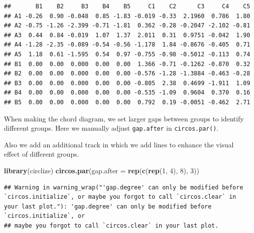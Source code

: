 \documentclass[]{book}
\newenvironment{Shaded}{\begin{snugshade}}{\end{snugshade}}
\newcommand{\KeywordTok}[1]{\textcolor[rgb]{0.13,0.29,0.53}{\textbf{#1}}}
\newcommand{\DataTypeTok}[1]{\textcolor[rgb]{0.13,0.29,0.53}{#1}}
\newcommand{\DecValTok}[1]{\textcolor[rgb]{0.00,0.00,0.81}{#1}}
\newcommand{\NormalTok}[1]{#1}
\begin{document}
\begin{verbatim}
##       B1    B2     B3    B4    B5     C1    C2      C3     C4    C5
## A1 -0.26  0.90 -0.048  0.85 -1.83 -0.019 -0.33  2.1960  0.786  1.80
## A2 -0.75 -1.26 -2.399 -0.71 -1.81  0.362 -0.28 -0.2047 -2.102 -0.81
## A3  0.44  0.84 -0.019  1.07  1.37  2.011  0.31  0.9751 -0.042  1.90
## A4 -1.28 -2.35 -0.089 -0.54 -0.56 -1.178  1.84 -0.8676 -0.405  0.71
## A5  1.18  0.61 -1.595  0.54  0.97 -0.755 -0.98 -0.5012 -0.113  0.74
## B1  0.00  0.00  0.000  0.00  0.00  1.366 -0.71 -0.1262 -0.870  0.32
## B2  0.00  0.00  0.000  0.00  0.00 -0.576 -1.28 -1.3884 -0.463 -0.28
## B3  0.00  0.00  0.000  0.00  0.00 -0.805  2.38  0.4699 -1.911  1.09
## B4  0.00  0.00  0.000  0.00  0.00 -0.535 -1.09  0.9604  0.370  0.16
## B5  0.00  0.00  0.000  0.00  0.00  0.792  0.19 -0.0051 -0.462  2.71
\end{verbatim}

When making the chord diagram, we set larger gaps between groups to
identify different groups. Here we manually adjust \texttt{gap.after} in
\texttt{circos.par()}.

Also we add an additional track in which we add lines to enhance the
visual effect of different groups.

\begin{Shaded}
\begin{Highlighting}[]
\KeywordTok{library}\NormalTok{(circlize)}
\KeywordTok{circos.par}\NormalTok{(}\DataTypeTok{gap.after =} \KeywordTok{rep}\NormalTok{(}\KeywordTok{c}\NormalTok{(}\KeywordTok{rep}\NormalTok{(}\DecValTok{1}\NormalTok{, }\DecValTok{4}\NormalTok{), }\DecValTok{8}\NormalTok{), }\DecValTok{3}\NormalTok{))}
\end{Highlighting}
\end{Shaded}

\begin{verbatim}
## Warning in warning_wrap("'gap.degree' can only be modified before `circos.initialize`, or maybe you forgot to call `circos.clear` in your last plot."): 'gap.degree' can only be modified before `circos.initialize`, or
## maybe you forgot to call `circos.clear` in your last plot.
\end{verbatim}
\end{document}
